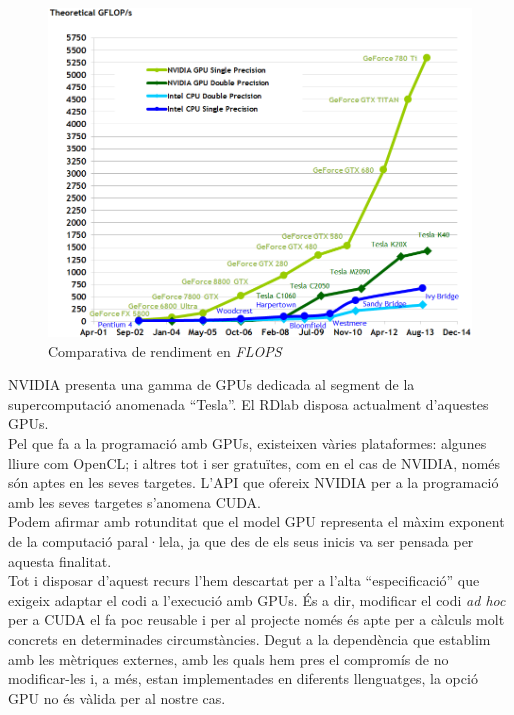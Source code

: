 \documentclass[11pt,a4paper]{article}
\begin{document}
\begin{figure} [!h]
\centering
\includegraphics[width=12cm]{resources/floating-point-operations-per-second.png}
\caption{Comparativa de rendiment en \textit{FLOPS}}
\end{figure}

NVIDIA presenta una gamma de GPUs dedicada al segment de la supercomputació anomenada ``Tesla''\cite{tesla}. El RDlab disposa actualment d'aquestes GPUs.
\\

Pel que fa a la programació amb GPUs, existeixen vàries plataformes: algunes lliure com OpenCL\cite{opencl}; i altres tot i ser gratuïtes, com en el cas de NVIDIA, només són aptes en les seves targetes. L'API que ofereix NVIDIA per a la programació amb les seves targetes s'anomena CUDA\cite{cuda}.
\\

Podem afirmar amb rotunditat que el model GPU representa el màxim exponent de la computació paral·lela, ja que des de els seus inicis va ser pensada per aquesta finalitat.
\\

Tot i disposar d'aquest recurs l'hem descartat per a l'alta ``especificació'' que exigeix adaptar el codi a l'execució amb GPUs. És a dir, modificar el codi \emph{ad hoc} per a CUDA el fa poc reusable i per al projecte només és apte per a càlculs molt concrets en determinades circumstàncies. Degut a la dependència que establim amb les mètriques externes, amb les quals hem pres el compromís de no modificar-les i, a més, estan implementades en diferents llenguatges, la opció GPU no és vàlida per al nostre cas.
\\
\end{document}
